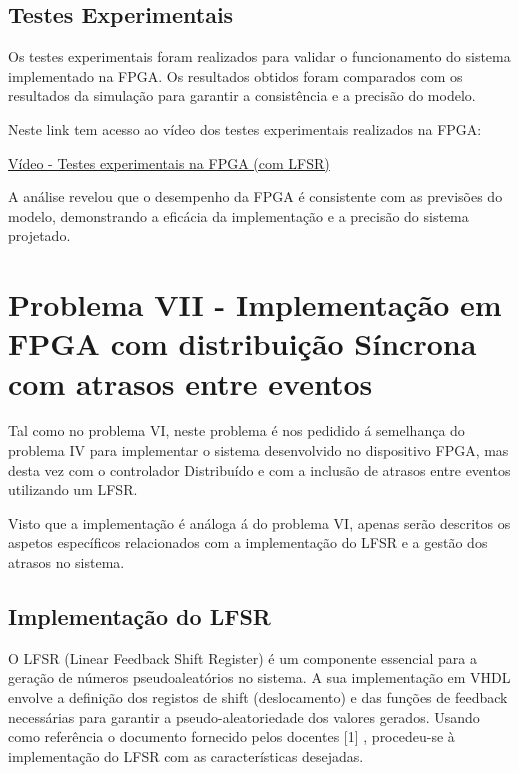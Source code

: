 \newpage

\subsection{Testes Experimentais}
Os testes experimentais foram realizados para validar o funcionamento do sistema implementado na FPGA. Os resultados obtidos foram comparados com os resultados da simulação para garantir a consistência e a precisão do modelo.

Neste link tem acesso ao vídeo dos testes experimentais realizados na FPGA:

\vspace{1em}

\href{https://unlpt-my.sharepoint.com/:v:/g/personal/jafe_lopes_fct_unl_pt/EbCBCypgsytKpl_b_LGAicUBknUJlGIr7qVPtiyCcbbboQ?e=hTIkwX}{Vídeo - Testes experimentais na FPGA (com LFSR)}

\vspace{1em}

A análise revelou que o desempenho da FPGA é consistente com as previsões do modelo, demonstrando a eficácia da implementação e a precisão do sistema projetado.

\newpage

\section{Problema VII - Implementação em FPGA com distribuição Síncrona com atrasos entre eventos}

Tal como no problema VI, neste problema é nos pedidido á semelhança do problema IV para implementar o sistema desenvolvido no dispositivo FPGA, mas desta vez com o controlador Distribuído e com a inclusão de atrasos entre eventos utilizando um LFSR.

\vspace{1em}

Visto que a implementação é análoga á do problema VI, apenas serão descritos os aspetos específicos relacionados com a implementação do LFSR e a gestão dos atrasos no sistema.

\subsection{Implementação do LFSR}
O LFSR (Linear Feedback Shift Register) é um componente essencial para a geração de números pseudoaleatórios no sistema. A sua implementação em VHDL envolve a definição dos registos de shift (deslocamento) e das funções de feedback necessárias para garantir a pseudo-aleatoriedade dos valores gerados.
Usando como referência o documento fornecido pelos docentes [1] , procedeu-se à implementação do LFSR com as características desejadas.

